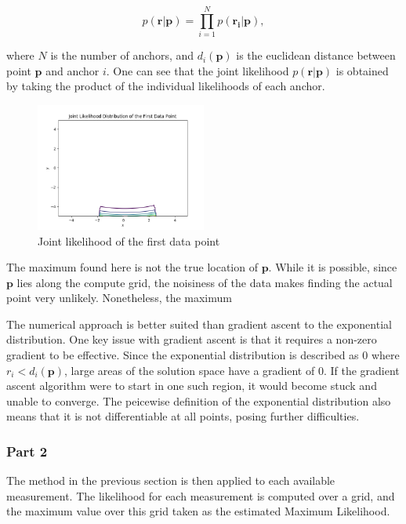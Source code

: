 \documentclass[a4paper]{article}
\begin{document}
\[
p(\bm{r}|\bm{p}) = \prod_{i=1}^N p(\bm{r_i}|\bm{p}) ,
\]

where $N$ is the number of anchors, and $d_i(\bm{p})$ is the euclidean distance between point $\bm{p}$ and anchor $i$.  One can see that the joint likelihood $p(\bm{r}|\bm{p})$ is obtained by taking the product of the individual likelihoods of each anchor.

\begin{figure}[h]
	\begin{center}
		\includegraphics[width=0.5\textwidth]{joint_likelihood_dist.png}
		\caption{Joint likelihood of the first data point}
	\end{center}
\end{figure}

The maximum found here is not the true location of $\bm{p}$.  While it is possible, since $\bm{p}$ lies along the compute grid, the noisiness of the data makes finding the actual point very unlikely.  Nonetheless, the maximum 

The numerical approach is better suited than gradient ascent to the exponential distribution.  One key issue with gradient ascent is that it requires a non-zero gradient to be effective.  Since the exponential distribution is described as 0 where $r_i < d_i(\bm{p})$, large areas of the solution space have a gradient of 0.  If the gradient ascent algorithm were to start in one such region, it would become stuck and unable to converge.  The peicewise definition of the exponential distribution also means that it is not differentiable at all points, posing further difficulties.

\subsubsection*{Part 2}

The method in the previous section is then applied to each available measurement.  The likelihood for each measurement is computed over a grid, and the maximum value over this grid taken as the estimated Maximum Likelihood.
\end{document}
